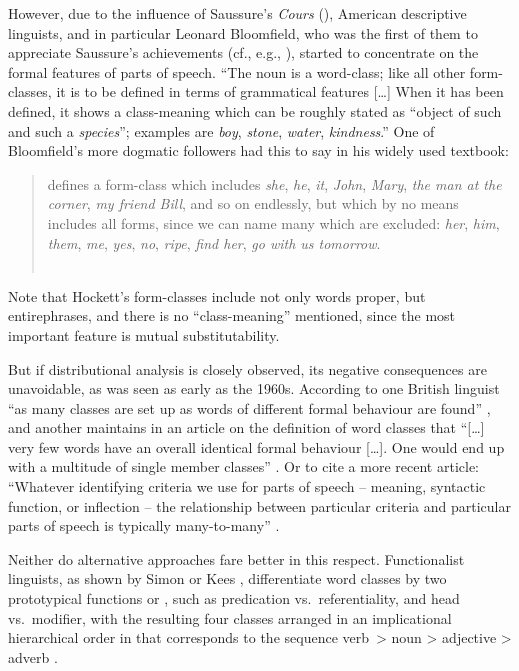 \documentclass[output=paper]{langsci/langscibook}
\begin{document}
However, due to the influence of Saussure’s \emph{Cours}
(\citeyear{Saussure1916}), American descriptive linguists, and in particular
Leonard Bloomfield, who was the first of them to appreciate Saussure’s
achievements (cf., e.g., \citealt{Koerner1995}), started to concentrate on the
formal features of parts of speech. “The noun is a word-class; like all other
form-classes, it is to be defined in terms of grammatical features [\dots{}] When it
has been defined, it shows a class-meaning which can be roughly stated as
\enquote{object of such and such a \emph{species}}; examples are \emph{boy},
\emph{stone}, \emph{water}, \emph{kindness}.” \citep[202]{Bloomfield1935} One
of Bloomfield’s more dogmatic followers had this to say in his widely used
textbook: 

\begin{quote} defines a form-class which
includes \emph{she}, \emph{he}, \emph{it}, \emph{John}, \emph{Mary}, \emph{the
man at the corner}, \emph{my friend Bill}, and so on endlessly, but which by no
means includes all forms, since we can name many which are excluded:
\emph{her}, \emph{him}, \emph{them}, \emph{me}, \emph{yes}, \emph{no},
\emph{ripe}, \emph{find her}, \emph{go with us tomorrow}.\\\hbox{}\hfill%
\hbox{\citep[162]{Hockett1958} }
\end{quote}
Note that Hockett’s form-classes include not only
words proper, but entire\linebreak phrases, and there is no \enquote{class-meaning}
mentioned, since the most important feature is mutual substitutability.\largerpage[2]

But if distributional analysis is closely observed, its negative consequences
are unavoidable, as was seen as early as the 1960s. According to one British
linguist \enquote{as many classes are set up as words of different formal
behaviour are found} \parencite[174]{Robins1980}, and another maintains in an
article on the definition of word classes that “[\dots{}] very few words have
an overall identical formal behaviour [\dots{}]. One would end up with a
multitude of single member classes” \citep[28]{Crystal1967}. Or to cite a more
recent article: “Whatever identifying criteria we use for parts of speech –
meaning, syntactic function, or inflection – the relationship between
particular criteria and particular parts of speech is typically many-to-many”
\citep[3]{Anward2000}.

Neither do alternative approaches fare better in this respect. Functionalist
linguists, as shown by Simon \citet{Dik1989} or Kees \citet{Hengeveld1992},
differentiate word classes by two prototypical functions or , such as
predication vs.\ referentiality, and head vs.\ modifier, with the resulting
four classes arranged in an implicational hierarchical order in 
that corresponds to the sequence verb~> noun > adjective > adverb
\citep{Hengeveld1992}.
\end{document}
